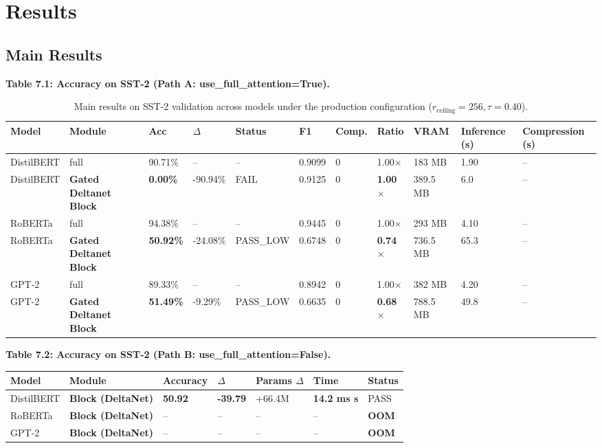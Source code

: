 
\section{Results}

\subsection{Main Results}

\textbf{Table 7.1: Accuracy on SST-2 (Path A: use\_full\_attention=True).}

\begin{table}[t]
\centering
\small
\begin{tabular}{lllllllllll}
\toprule
\textbf{Model} & \textbf{Module} & \textbf{Acc} & \textbf{$\Delta$} & \textbf{Status} & \textbf{F1} & \textbf{Comp.} & \textbf{Ratio} & \textbf{VRAM} & \textbf{Inference (s)} & \textbf{Compression (s)} \\
\midrule
DistilBERT & full & 90.71\% & -- & -- & 0.9099 & 0 & 1.00$\times$ & 183 MB & 1.90 & -- \\
DistilBERT & \textbf{Gated Deltanet Block} & \textbf{0.00\%} & -90.94\% & FAIL & 0.9125 & 0 & \textbf{1.00$\times$} & 389.5 MB & 6.0 & -- \\
RoBERTa & full & 94.38\% & -- & -- & 0.9445 & 0 & 1.00$\times$ & 293 MB & 4.10 & -- \\
RoBERTa & \textbf{Gated Deltanet Block} & \textbf{50.92\%} & -24.08\% & PASS\_LOW & 0.6748 & 0 & \textbf{0.74$\times$} & 736.5 MB & 65.3 & -- \\
GPT-2 & full & 89.33\% & -- & -- & 0.8942 & 0 & 1.00$\times$ & 382 MB & 4.20 & -- \\
GPT-2 & \textbf{Gated Deltanet Block} & \textbf{51.49\%} & -9.29\% & PASS\_LOW & 0.6635 & 0 & \textbf{0.68$\times$} & 788.5 MB & 49.8 & -- \\
\bottomrule
\end{tabular}
\caption{Main results on SST-2 validation across models under the production configuration ($r_{\mathrm{ceiling}}=256, \tau=0.40$).}
\label{tab:main_sst2}
\end{table}

\textbf{Table 7.2: Accuracy on SST-2 (Path B: use\_full\_attention=False).}

\begin{table}[H]
\centering
\small
\begin{tabular}{lllllll}
\toprule
\textbf{Model} & \textbf{Module} & \textbf{Accuracy} & \textbf{$\Delta$} & \textbf{Params $\Delta$} & \textbf{Time} & \textbf{Status} \\
\midrule
DistilBERT & \textbf{Block (DeltaNet)} & \textbf{50.92} & \textbf{-39.79} & +66.4M & \textbf{14.2 ms s} & PASS \\
RoBERTa & \textbf{Block (DeltaNet)} & -- & -- & -- & -- & \textbf{OOM} \\
GPT-2 & \textbf{Block (DeltaNet)} & -- & -- & -- & -- & \textbf{OOM} \\
\bottomrule
\end{tabular}
\end{table}

